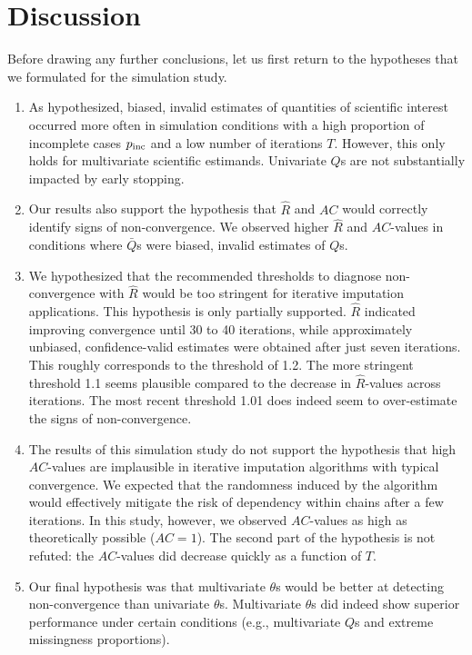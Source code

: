 \documentclass[Royal,times,sageh]{sagej}
\begin{document}
\hypertarget{discussion}{%
\section{Discussion}\label{discussion}}

Before drawing any further conclusions, let us first return to the hypotheses that we formulated for the simulation study.

\begin{enumerate}
\def\labelenumi{\arabic{enumi}.}
\item
  As hypothesized, biased, invalid estimates of quantities of scientific interest occurred more often in simulation conditions with a high proportion of incomplete cases \(p_{\rm inc}\) and a low number of iterations \(T\). However, this only holds for multivariate scientific estimands. Univariate \(Q\)s are not substantially impacted by early stopping.
\item
  Our results also support the hypothesis that \(\widehat{R}\) and \(AC\) would correctly identify signs of non-convergence. We observed higher \(\widehat{R}\) and \(AC\)-values in conditions where \(\bar{Q}\)s were biased, invalid estimates of \(Q\)s.
\item
  We hypothesized that the recommended thresholds to diagnose non-convergence with \(\widehat{R}\) would be too stringent for iterative imputation applications. This hypothesis is only partially supported. \(\widehat{R}\) indicated improving convergence until 30 to 40 iterations, while approximately unbiased, confidence-valid estimates were obtained after just seven iterations. This roughly corresponds to the threshold of 1.2. The more stringent threshold 1.1 seems plausible compared to the decrease in \(\widehat{R}\)-values across iterations. The most recent threshold 1.01 does indeed seem to over-estimate the signs of non-convergence.
\item
  The results of this simulation study do not support the hypothesis that high \(AC\)-values are implausible in iterative imputation algorithms with typical convergence. We expected that the randomness induced by the algorithm would effectively mitigate the risk of dependency within chains after a few iterations. In this study, however, we observed \(AC\)-values as high as theoretically possible (\(AC=1\)). The second part of the hypothesis is not refuted: the \(AC\)-values did decrease quickly as a function of \(T\).
\item
  Our final hypothesis was that multivariate \(\theta\)s would be better at detecting non-convergence than univariate \(\theta\)s. Multivariate \(\theta\)s did indeed show superior performance under certain conditions (e.g., multivariate \(Q\)s and extreme missingness proportions).
\end{enumerate}
\end{document}
